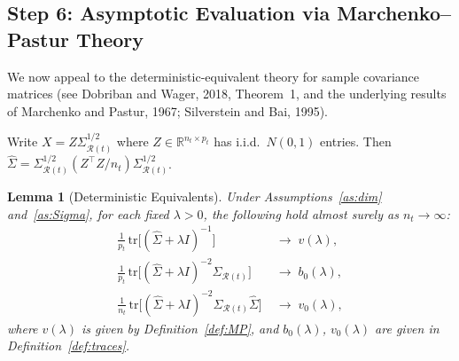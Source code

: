 \documentclass[11pt]{article}
\newtheorem{lemma}[theorem]{Lemma}
\theoremstyle{definition}
\newcommand{\Rt}{\mathcal{R}(t)}
\newcommand{\SigR}{\Sigma_{\Rt}}
\newcommand{\hSig}{\widehat{\Sigma}}
\newcommand{\tr}{\mathrm{tr}}
\newcommand{\R}{\mathbb{R}}
\begin{document}
\subsection{Step 6: Asymptotic Evaluation via Marchenko--Pastur Theory}
\label{sec:step6}
 
We now appeal to the deterministic-equivalent theory for sample
covariance matrices (see Dobriban and Wager, 2018, Theorem~1, and the
underlying results of Marchenko and Pastur, 1967; Silverstein and Bai,
1995).
 
Write $X=Z\SigR^{1/2}$ where $Z\in\R^{n_t\times p_t}$ has i.i.d.\
$N(0,1)$ entries.  Then
$\hSig=\SigR^{1/2}(Z^\top Z/n_t)\SigR^{1/2}$.
 
\begin{lemma}[Deterministic Equivalents]\label{lem:det_equiv}
Under Assumptions~\ref{as:dim} and~\ref{as:Sigma}, for each fixed
$\lambda>0$, the following hold almost surely as $n_t\to\infty$:
\begin{align}
  \frac{1}{p_t}\,\tr\!\bigl[(\hSig+\lambda I)^{-1}\bigr]
  &\;\longrightarrow\; v(\lambda),
  \label{eq:DE1}\\[4pt]
  \frac{1}{p_t}\,\tr\!\bigl[(\hSig+\lambda I)^{-2}\SigR\bigr]
  &\;\longrightarrow\; b_0(\lambda),
  \label{eq:DE2}\\[4pt]
  \frac{1}{n_t}\,\tr\!\bigl[(\hSig+\lambda I)^{-2}\SigR\hSig\bigr]
  &\;\longrightarrow\; v_0(\lambda),
  \label{eq:DE3}
\end{align}
where $v(\lambda)$ is given by Definition~\ref{def:MP},
and $b_0(\lambda)$, $v_0(\lambda)$ are given in
Definition~\ref{def:traces}.
\end{lemma}
 
\end{document}
